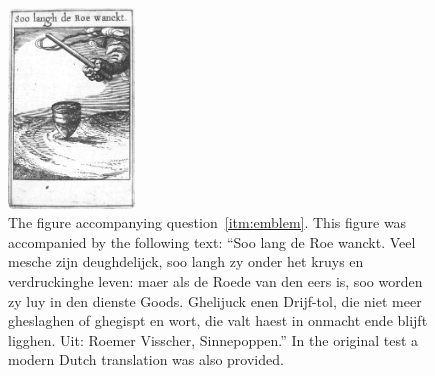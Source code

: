 \begin{figure}
    \centering
    \includegraphics[width=0.3\textwidth]{img/emblem.jpg}
    \caption{The figure accompanying question~\protect\ref{itm:emblem}. This figure was accompanied by the following text: ``Soo lang de Roe wanckt. Veel mesche zijn deughdelijck, soo langh zy onder het kruys en verdruckinghe leven: maer als de Roede van den eers is, soo worden zy luy in den dienste Goods. Ghelijuck enen Drijf-tol, die niet meer gheslaghen of ghegispt en wort, die valt haest in onmacht ende blijft ligghen. Uit: Roemer Visscher, Sinnepoppen.'' In the original test a modern Dutch translation was also provided.}
    \label{fig:emblem}
\end{figure}
